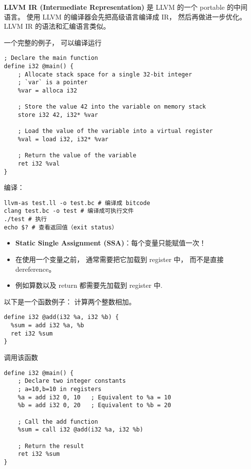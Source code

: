 
\begin{issues}
\issueDraft
\end{issues}


\textbf{LLVM IR (Intermediate Representation)} 是 LLVM 的一个 portable 的中间语言。 使用 LLVM 的编译器会先把高级语言编译成 IR， 然后再做进一步优化。 LLVM IR 的语法和汇编语言类似。

一个完整的例子， 可以编译运行
\begin{lstlisting}[language=none,caption=test.ll]
; Declare the main function
define i32 @main() {
    ; Allocate stack space for a single 32-bit integer
    ; `var` is a pointer
    %var = alloca i32

    ; Store the value 42 into the variable on memory stack
    store i32 42, i32* %var

    ; Load the value of the variable into a virtual register
    %val = load i32, i32* %var

    ; Return the value of the variable
    ret i32 %val
}
\end{lstlisting}

编译：
\begin{lstlisting}[language=none]
llvm-as test.ll -o test.bc # 编译成 bitcode
clang test.bc -o test # 编译成可执行文件
./test # 执行
echo $? # 查看返回值（exit status）
\end{lstlisting}

\begin{itemize}
\item \textbf{Static Single Assignment (SSA)}：每个变量只能赋值一次！
\item  在使用一个变量之前， 通常需要把它加载到 register 中， 而不是直接 dereference。
\item 例如算数以及 return 都需要先加载到 register 中.
\end{itemize}

以下是一个函数例子： 计算两个整数相加。
\begin{lstlisting}[language=none]
define i32 @add(i32 %a, i32 %b) {
  %sum = add i32 %a, %b
  ret i32 %sum
}
\end{lstlisting}

调用该函数
\begin{lstlisting}[language=none]
define i32 @main() {
    ; Declare two integer constants
    ; a=10,b=10 in registers
    %a = add i32 0, 10   ; Equivalent to %a = 10
    %b = add i32 0, 20   ; Equivalent to %b = 20

    ; Call the add function
    %sum = call i32 @add(i32 %a, i32 %b)

    ; Return the result
    ret i32 %sum
}
\end{lstlisting}

